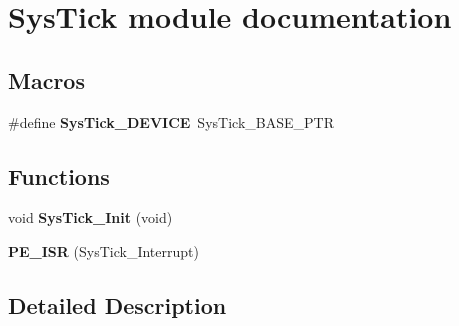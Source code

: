 \hypertarget{group___sys_tick__module}{\section{Sys\-Tick module documentation}
\label{group___sys_tick__module}
}
\subsection*{Macros}
\begin{DoxyCompactItemize}
\item 
\hypertarget{group___sys_tick__module_ga62bf6edcf6f3be785ea09edd640d3565}{\#define {\bfseries Sys\-Tick\-\_\-\-D\-E\-V\-I\-C\-E}~Sys\-Tick\-\_\-\-B\-A\-S\-E\-\_\-\-P\-T\-R}\label{group___sys_tick__module_ga62bf6edcf6f3be785ea09edd640d3565}

\end{DoxyCompactItemize}
\subsection*{Functions}
\begin{DoxyCompactItemize}
\item 
\hypertarget{group___sys_tick__module_gaeb71ef4b996788e4aa8cda6ef617f58f}{void {\bfseries Sys\-Tick\-\_\-\-Init} (void)}\label{group___sys_tick__module_gaeb71ef4b996788e4aa8cda6ef617f58f}

\item 
\hypertarget{group___sys_tick__module_ga15d641eb67ba475a486d9e9199682c3a}{{\bfseries P\-E\-\_\-\-I\-S\-R} (Sys\-Tick\-\_\-\-Interrupt)}\label{group___sys_tick__module_ga15d641eb67ba475a486d9e9199682c3a}

\end{DoxyCompactItemize}


\subsection{Detailed Description}
